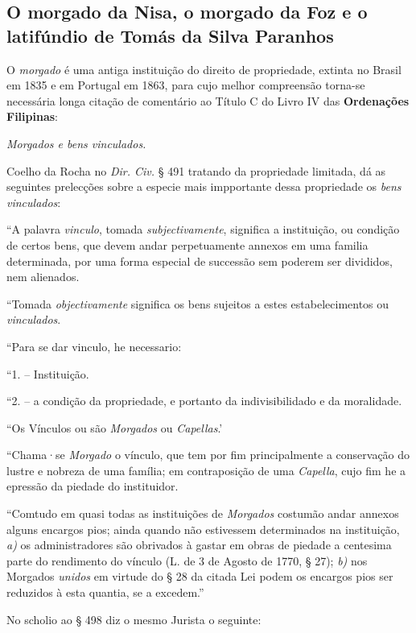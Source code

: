 \subsection{O morgado da Nisa, o morgado da Foz e o latifúndio de Tomás da Silva Paranhos}\label{subsec:nisa}

O \textit{morgado} é uma antiga instituição do direito de propriedade, extinta no Brasil em 1835 e em Portugal em 1863, para cujo melhor compreensão torna-se necessária longa citação de comentário ao Título C do Livro IV das \textbf{Ordenações Filipinas}: 

\begin{citacao}
\textit{Morgados e bens vinculados.}

Coelho da Rocha no \textit{Dir. Civ.} § 491 tratando da propriedade limitada, dá as seguintes prelecções sobre a especie mais impportante dessa propriedade os \textit{bens vinculados}:

``A palavra \textit{vinculo}, tomada \textit{subjectivamente}, significa a instituição, ou condição de certos bens, que devem andar perpetuamente annexos em uma familia determinada, por uma forma especial de successão sem poderem ser divididos, nem alienados.

``Tomada \textit{objectivamente} significa os bens sujeitos a estes estabelecimentos ou \textit{vinculados}.

``Para se dar vinculo, he necessario:

``1. -- Instituição.

``2. -- a condição da propriedade, e portanto da indivisibilidado e da moralidade.

``Os Vínculos ou são \textit{Morgados} ou \textit{Capellas}.'

``Chama·se \textit{Morgado} o vínculo, que tem por fim principalmente a conservação do lustre e nobreza de uma família; em contraposição de uma \textit{Capella}, cujo fim he a epressão da piedade do instituidor.

``Comtudo em quasi todas as instituições de \textit{Morgados} costumão andar annexos alguns encargos pios; ainda quando não estivessem determinados na instituição, \textit{a)} os administradores são obrivados à gastar em obras de piedade a centesima parte do rendimento do vínculo (L. de 3 de Agosto de 1770, § 27); \textit{b)} nos Morgados \textit{unidos} em virtude do § 28 da citada Lei podem os encargos pios ser reduzidos à esta quantia, se a excedem.''

No scholio ao § 498 diz o mesmo Jurista o seguinte:


\end{citacao}

